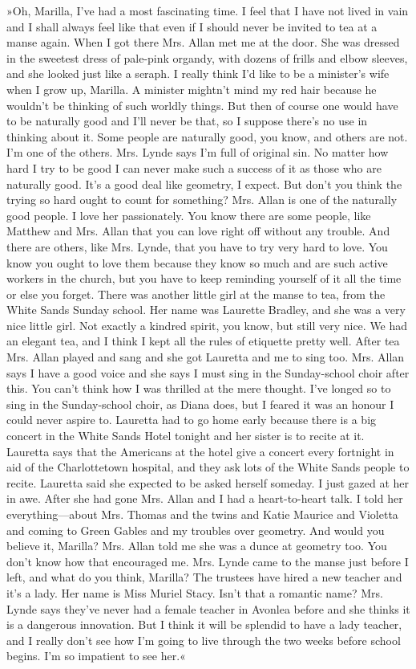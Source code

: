 »Oh, Marilla, I've had a most fascinating time. I feel that I have not lived in vain and I shall always feel like that even if I should never be invited to tea at a manse again. When I got there Mrs. Allan met me at the door. She was dressed in the sweetest dress of pale-pink organdy, with dozens of frills and elbow sleeves, and she looked just like a seraph. I really think I'd like to be a minister's wife when I grow up, Marilla. A minister mightn't mind my red hair because he wouldn't be thinking of such worldly things. But then of course one would have to be naturally good and I'll never be that, so I suppose there's no use in thinking about it. Some people are naturally good, you know, and others are not. I'm one of the others. Mrs. Lynde says I'm full of original sin. No matter how hard I try to be good I can never make such a success of it as those who are naturally good. It's a good deal like geometry, I expect. But don't you think the trying so hard ought to count for something? Mrs. Allan is one of the naturally good people. I love her passionately. You know there are some people, like Matthew and Mrs. Allan that you can love right off without any trouble. And there are others, like Mrs. Lynde, that you have to try very hard to love. You know you ought to love them because they know so much and are such active workers in the church, but you have to keep reminding yourself of it all the time or else you forget. There was another little girl at the manse to tea, from the White Sands Sunday school. Her name was Laurette Bradley, and she was a very nice little girl. Not exactly a kindred spirit, you know, but still very nice. We had an elegant tea, and I think I kept all the rules of etiquette pretty well. After tea Mrs. Allan played and sang and she got Lauretta and me to sing too. Mrs. Allan says I have a good voice and she says I must sing in the Sunday-school choir after this. You can't think how I was thrilled at the mere thought. I've longed so to sing in the Sunday-school choir, as Diana does, but I feared it was an honour I could never aspire to. Lauretta had to go home early because there is a big concert in the White Sands Hotel tonight and her sister is to recite at it. Lauretta says that the Americans at the hotel give a concert every fortnight in aid of the Charlottetown hospital, and they ask lots of the White Sands people to recite. Lauretta said she expected to be asked herself someday. I just gazed at her in awe. After she had gone Mrs. Allan and I had a heart-to-heart talk. I told her everything—about Mrs. Thomas and the twins and Katie Maurice and Violetta and coming to Green Gables and my troubles over geometry. And would you believe it, Marilla? Mrs. Allan told me she was a dunce at geometry too. You don't know how that encouraged me. Mrs. Lynde came to the manse just before I left, and what do you think, Marilla? The trustees have hired a new teacher and it's a lady. Her name is Miss Muriel Stacy. Isn't that a romantic name? Mrs. Lynde says they've never had a female teacher in Avonlea before and she thinks it is a dangerous innovation. But I think it will be splendid to have a lady teacher, and I really don't see how I'm going to live through the two weeks before school begins. I'm so impatient to see her.«